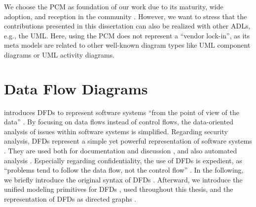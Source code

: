 We choose the \ac{PCM} as foundation of our work due to its maturity, wide adoption, and reception in the community \cite{koziolek_tracing_2022}.
However, we want to stress that the contributions presented in this dissertation can also be realized with other \acp{ADL}, e.g., the \ac{UML}.
Here, using the \ac{PCM} does not represent a \enquote{vendor lock-in}, as its meta models are related to other well-known diagram types like \ac{UML} component diagrams or \ac{UML} activity diagrams.






\section{Data Flow Diagrams}%
\label{sec:foundations:dfd}

\textcite{demarco_structure_1979} introduces \acfp{DFD} to represent software systems \enquote{from the point of view of the data} \cite{demarco_structure_1979}.
By focusing on data flows instead of control flows, the data-oriented analysis of issues within software systems is simplified.
Regarding security analysis, \acp{DFD} represent a simple yet powerful representation of software systems \cite{schneider_how_2024}.
They are used both for documentation and discussion \cite{sion_security_2020,schneider_how_2024}, and also automated analysis \cite{alshareef_precise_2022,seifermann_detecting_2022,canfora_data_1992,berger_automatically_2016,tuma_flaws_2019,tuma_automating_2020}.
Especially regarding confidentiality, the use of \acp{DFD} is expedient, as \enquote{problems tend to follow the data flow, not the control flow} \cite{shostack_threat_2014}.
In the following, we briefly introduce the original syntax of \acp{DFD} \cite{demarco_structure_1979}.
Afterward, we introduce the unified modeling primitives for \acp{DFD} \cite{seifermann_unified_2021}, used throughout this thesis, and the representation of \acp{DFD} as directed graphs \cite{diestel_graph_2017,bang-jensen_digraphs_2009}.



